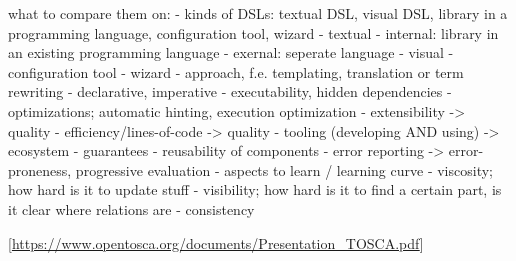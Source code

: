 what to compare them on:
- kinds of DSLs: textual DSL, visual DSL, library in a programming language, configuration tool, wizard
  - textual
    - internal: library in an existing programming language
    - exernal: seperate language
  - visual
    - configuration tool
    - wizard
- approach, f.e. templating, translation or term rewriting
  - declarative, imperative
- executability, hidden dependencies
- optimizations; automatic hinting, execution optimization
- extensibility -> quality
- efficiency/lines-of-code -> quality
- tooling (developing AND using) -> ecosystem
- guarantees
- reusability of components
- error reporting -> error-proneness, progressive evaluation
- aspects to learn / learning curve
- viscosity; how hard is it to update stuff
- visibility; how hard is it to find a certain part, is it clear where relations are
- consistency


[\url{https://www.opentosca.org/documents/Presentation_TOSCA.pdf}]

